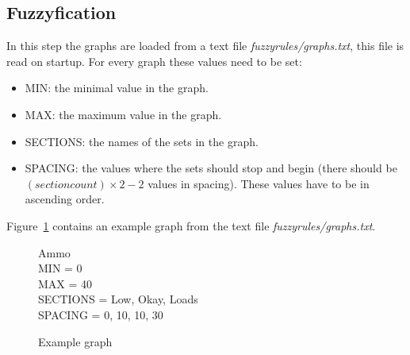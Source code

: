 \documentclass[10pt]{extarticle} %
\begin{document}
   \subsection{Fuzzyfication}
   In this step the graphs are loaded from a text file \emph{fuzzyrules/graphs.txt}, this file is read on startup. For every graph these values need to be set: 
   \begin{itemize}
   \item MIN: the minimal value in the graph.
   \item MAX: the maximum value in the graph.
   \item SECTIONS: the names of the sets in the graph.
   \item SPACING: the values where the sets should stop and begin (there should be \( (section count) \times 2 - 2\) values in spacing). These values have to be in ascending order.
   \end{itemize}
Figure~\ref{fig:fuzzygraph} contains an example graph from the text file \emph{fuzzyrules/graphs.txt}.
   \begin{figure}[h!]
   {\ttfamily 
   		Ammo\\
		MIN = 0\\
		MAX = 40\\
		SECTIONS = Low, Okay, Loads\\
		SPACING = 0, 10, 10, 30  \\
   }
   \caption{Example graph}
   \label{fig:fuzzygraph}
   \end{figure}\\
   
   
\end{document}
